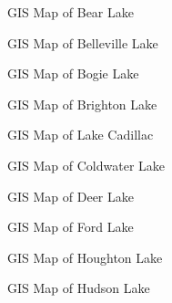 
\begin{figure}[t]
\centerline{%
  }
\caption{GIS Map of Bear Lake}
\end{figure}

\begin{figure}[t]
\centerline{%
  }
\caption{GIS Map of Belleville Lake}
\end{figure}

\begin{figure}[t]
\centerline{%
  }
\caption{GIS Map of Bogie Lake}
\end{figure}

\begin{figure}[t]
\centerline{%
  }
\caption{GIS Map of Brighton Lake}
\end{figure}

\begin{figure}[t]
\centerline{%
  }
\caption{GIS Map of Lake Cadillac}
\end{figure}

\begin{figure}[t]
\centerline{%
  }
\caption{GIS Map of Coldwater Lake}
\end{figure}

\begin{figure}[t]
\centerline{%
  }
\caption{GIS Map of Deer Lake}
\end{figure}

\begin{figure}[t]
\centerline{%
  }
\caption{GIS Map of Ford Lake}
\end{figure}

\begin{figure}[t]
\centerline{%
  }
\caption{GIS Map of Houghton Lake}
\end{figure}

\begin{figure}[t]
\centerline{%
  }
\caption{GIS Map of Hudson Lake}
\end{figure}

